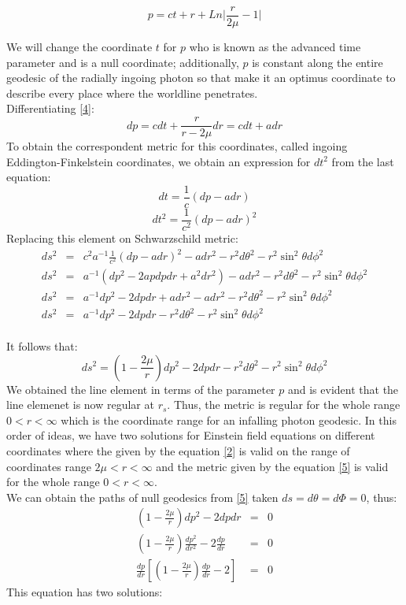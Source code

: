 \documentclass[letterpaper,11pt,onecolumn]{article}
\begin{document}
\begin{equation}
    p= ct + r + Ln\Big| \frac{r}{2\mu}-1 \Big|\label{4}
\end{equation}

We will change the coordinate $t$ for $p$ who is known as the advanced time parameter and is a null coordinate; additionally, $p$ is constant along the entire geodesic of the radially ingoing photon so that make it an optimus coordinate to describe every place where the worldline penetrates.\\
Differentiating \ref{4}: 
\begin{equation*}
    dp= cdt +\frac{r}{r-2\mu}dr=cdt+adr 
\end{equation*}
To obtain the correspondent metric for this coordinates, called ingoing Eddington-Finkelstein coordinates, we obtain an expression for $dt^2$ from the last equation:
\begin{equation*}
    dt= \frac{1}{c} (dp-adr)
\end{equation*}
\begin{equation*}
    dt^2= \frac{1}{c^2} (dp-adr)^2
\end{equation*}
Replacing this element on Schwarzschild metric:
\\
\begin{eqnarray*}
    	ds^2 &=&c^2a^{-1}\frac{1}{c^2} (dp-adr)^2 - a dr^2 - r^2 d\theta^2 - r^2 \sin^2 \theta d\phi^2\\
    	ds^2 &=& a^{-1}(dp^2-2apdpdr+a^2dr^2) - a dr^2 - r^2 d\theta^2 - r^2 \sin^2 \theta d\phi^2\\
    	ds^2 &=& a^{-1}dp^2-2dpdr+adr^2- a dr^2 - r^2 d\theta^2 - r^2 \sin^2 \theta d\phi^2\\ 
    	ds^2 &=& a^{-1}dp^2-2dpdr-  r^2 d\theta^2 - r^2 \sin^2 \theta d\phi^2
\end{eqnarray*}
\\
It follows that:
\begin{equation}
ds^2 =\left( 1 - \frac{2\mu}{r}\right)dp^2-2dpdr- r^2 d\theta^2 - r^2 \sin^2 \theta d\phi^2 \label{5}
\end{equation}
We obtained the line element in terms of the parameter $p$ and is evident that the line elemenet is now regular at $r_s$. Thus, the metric is regular for the whole range $0<r<\infty$ which is the coordinate range for an infalling photon geodesic. In this order of ideas, we have two solutions for Einstein field equations on different coordinates where the given by the equation \ref{2}  is valid on the range of coordinates range $2\mu<r<\infty$ and the metric given by the equation \ref{5} is valid for the whole range $0<r<\infty$.
\\We can obtain the paths of null geodesics from \ref{5} taken $ds=d\theta=d\Phi=0$, thus:
\begin{eqnarray*}
\left( 1 - \frac{2\mu}{r}\right)dp^2-2dpdr&=&0\\
\left( 1 - \frac{2\mu}{r}\right)\frac{dp^2}{dr^2}-2\frac{dp}{dr}&=&0\\
\frac{dp}{dr}\left[\left( 1 - \frac{2\mu}{r}\right)\frac{dp}{dr}-2\right]&=&0
\end{eqnarray*}
This equation has two solutions:
\end{document}
